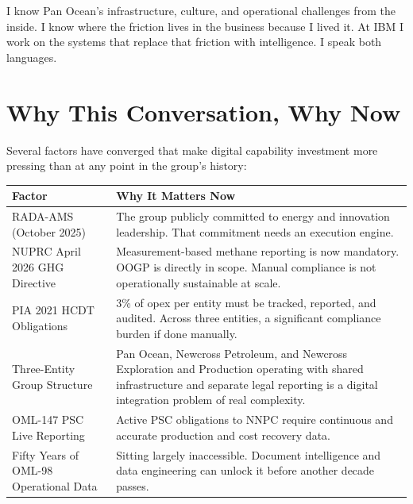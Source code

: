 \documentclass[10pt]{article}
\newcommand{\spacer}{\vspace{10pt}}
\newcommand{\bigspacer}{\vspace{16pt}}
\begin{document}
\spacer
I know Pan Ocean's infrastructure, culture, and operational challenges from
the inside. I know where the friction lives in the business because I lived
it. At IBM I work on the systems that replace that friction with intelligence.
I speak both languages.

\bigspacer

\section{Why This Conversation, Why Now}

Several factors have converged that make digital capability investment more
pressing than at any point in the group's history:

\spacer
\small
\begin{tabularx}{\columnwidth}{@{}lX@{}}
\toprule
\textbf{Factor} & \textbf{Why It Matters Now} \\
\midrule
RADA-AMS (October 2025)
  & The group publicly committed to energy and innovation leadership. That
    commitment needs an execution engine. \\
NUPRC April 2026 GHG Directive
  & Measurement-based methane reporting is now mandatory. OOGP is directly
    in scope. Manual compliance is not operationally sustainable at scale. \\
PIA 2021 HCDT Obligations
  & 3\% of opex per entity must be tracked, reported, and audited. Across
    three entities, a significant compliance burden if done manually. \\
Three-Entity Group Structure
  & Pan Ocean, Newcross Petroleum, and Newcross Exploration and Production
    operating with shared infrastructure and separate legal reporting is a
    digital integration problem of real complexity. \\
OML-147 PSC Live Reporting
  & Active PSC obligations to NNPC require continuous and accurate
    production and cost recovery data. \\
Fifty Years of OML-98 Operational Data
  & Sitting largely inaccessible. Document intelligence and data engineering
    can unlock it before another decade passes. \\
\bottomrule
\end{tabularx}
\normalsize

\bigspacer

\end{document}
